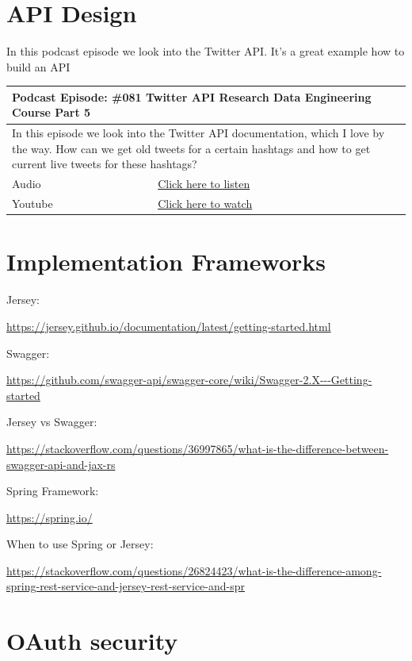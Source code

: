 \documentclass[12pt, numbers=noenddot]{scrreprt} %
\begin{document}
\section{API Design}
In this podcast episode we look into the Twitter API. It's a great example how to build an API

\begin{table}[h]
\begin{tabular}{ll}
\hline
\multicolumn{2}{l}{\textbf{Podcast Episode:} \#081 Twitter API Research Data Engineering Course Part 5} \\ \hline
\multicolumn{2}{p{15cm}}{In this episode we look into the Twitter API documentation, which I love by the way. How can we get old tweets for a certain hashtags and how to get current live tweets for these hashtags?}         \\ \hline
\multicolumn{1}{l|}{Audio}     & \href{https://anchor.fm/andreaskayy/episodes/081-How-to-get-tweets-from-the-Twitter-API-e45j32}{Click here to listen}   \\
\multicolumn{1}{l|}{Youtube}   & \href{https://youtu.be/UnAXKxeIlyg}{Click here to watch}   \\ \hline
\end{tabular}
\end{table}

\section{Implementation Frameworks}

Jersey:

\url{https://jersey.github.io/documentation/latest/getting-started.html}

Swagger:

\url{https://github.com/swagger-api/swagger-core/wiki/Swagger-2.X---Getting-started}

Jersey vs Swagger:

\url{https://stackoverflow.com/questions/36997865/what-is-the-difference-between-swagger-api-and-jax-rs}

Spring Framework:

\url{https://spring.io/}

When to use Spring or Jersey:

\url{https://stackoverflow.com/questions/26824423/what-is-the-difference-among-spring-rest-service-and-jersey-rest-service-and-spr}

\section{OAuth security}
\end{document}
